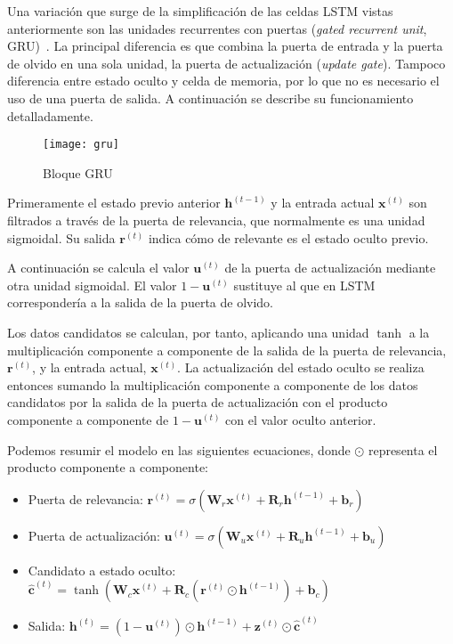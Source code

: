 Una variación que surge de la simplificación de las celdas LSTM vistas anteriormente son las unidades recurrentes con puertas (\textit{gated  recurrent unit}, GRU)~\cite{cho2014learning}. La principal diferencia es que combina la puerta de entrada y la puerta de olvido en una sola unidad, la puerta de actualización (\textit{update gate}). Tampoco diferencia entre estado oculto y celda de memoria, por lo que no es necesario el uso de una puerta de salida. A continuación se describe su funcionamiento detalladamente.

\begin{figure}[htpb]
  \centering
  \texttt{[image: gru]}
  \caption{Bloque GRU}
  \label{fig:gru}
\end{figure}


Primeramente el estado previo anterior $\textbf{h}^{(t-1)}$ y la entrada actual $\textbf{x}^{(t)}$ son filtrados a través de la puerta de relevancia, que normalmente es una unidad sigmoidal. Su salida $\textbf{r}^{(t)}$ indica cómo de relevante es el estado oculto previo.

A continuación se calcula el valor $\textbf{u}^{(t)}$ de la puerta de actualización mediante otra unidad sigmoidal. El valor $1 - \textbf{u}^{(t)}$ sustituye al que en LSTM correspondería a la salida de la puerta de olvido.

Los datos candidatos se calculan, por tanto, aplicando una unidad $\tanh$ a la multiplicación componente a componente de la salida de la puerta de relevancia, $\textbf{r}^{(t)}$, y la entrada actual, $\textbf{x}^{(t)}$. La actualización del estado oculto se realiza entonces sumando la multiplicación componente a componente de los datos candidatos por la salida de la puerta de actualización con el producto componente a componente de $1 - \textbf{u}^{(t)}$ con el valor oculto anterior.

Podemos resumir el modelo en las siguientes ecuaciones, donde $\odot$ representa el producto componente a componente:

\begin{itemize}
\item Puerta de relevancia: $ \textbf{r}^{(t)} = \sigma(\textbf{W}_r\textbf{x}^{(t)} + \textbf{R}_r \textbf{h}^{(t-1)} + \textbf{b}_r)$
\item Puerta de actualización: $ \textbf{u}^{(t)} = \sigma(\textbf{W}_u\textbf{x}^{(t)} + \textbf{R}_u \textbf{h}^{(t-1)} + \textbf{b}_u)$
\item Candidato a estado oculto: $\hat{\textbf{c}}^{(t)} = \tanh(\textbf{W}_c\textbf{x}^{(t)} + \textbf{R}_c( \textbf{r}^{(t)} \odot \textbf{h}^{(t-1)}) + \textbf{b}_c)$
\item Salida: $\textbf{h}^{(t)} = (1- \textbf{u}^{(t)}) \odot \textbf{h}^{(t-1)} + \textbf{z}^{(t)} \odot \hat{\textbf{c}}^{(t)}$
\end{itemize}

